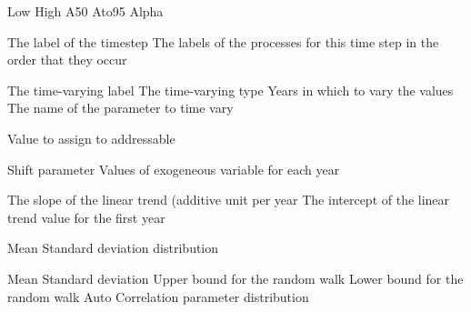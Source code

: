  {Low}
 {High}
 {A50}
 {Ato95}
 {Alpha}
\par\par
{} {The label of the timestep}
 {The labels of the processes for this time step in the order that they occur}
\par\par
{} {The time-varying label}
 {The time-varying type}
 {Years in which to vary the values}
 {The name of the parameter to time vary}
\par\textbf{}\par
{} {}
 {}
 {}
 {}
 {}
\par\textbf{}\par
{} {Value to assign to addressable}
\par\textbf{}\par
{} {Shift parameter}
 {Values of exogeneous variable for each year}
\par\textbf{}\par
{} {The slope of the linear trend (additive unit per year}
 {The intercept of the linear trend value for the first year}
\par\textbf{}\par
{} {Mean}
 {Standard deviation}
 {distribution}
\par\textbf{}\par
{} {Mean}
 {Standard deviation}
 {Upper bound for the random walk}
 {Lower bound for the random walk}
 {Auto Correlation parameter}
 {distribution}
